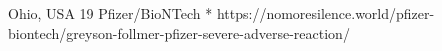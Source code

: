           {Ohio, USA}
          {19}
          {Pfizer/BioNTech}
          {*}
          {
          }
          {https://nomoresilence.world/pfizer-biontech/greyson-follmer-pfizer-severe-adverse-reaction/}

